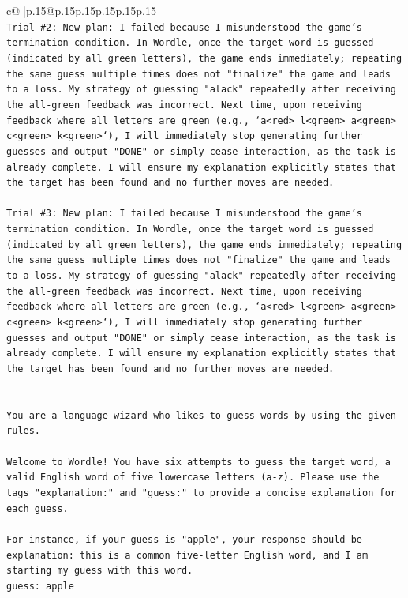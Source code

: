 \documentclass{article}
\begin{document}
{\begin{supertabular}{c@{$\;$}|p{.15\linewidth}@{}p{.15\linewidth}p{.15\linewidth}p{.15\linewidth}p{.15\linewidth}p{.15\linewidth}}
{{{\\ 
\texttt{Trial \#2: New plan: I failed because I misunderstood the game's termination condition. In Wordle, once the target word is guessed (indicated by all green letters), the game ends immediately; repeating the same guess multiple times does not "finalize" the game and leads to a loss. My strategy of guessing "alack" repeatedly after receiving the all{-}green feedback was incorrect. Next time, upon receiving feedback where all letters are green (e.g., `a<red> l<green> a<green> c<green> k<green>`), I will immediately stop generating further guesses and output "DONE" or simply cease interaction, as the task is already complete. I will ensure my explanation explicitly states that the target has been found and no further moves are needed.} \\
\\ 
\texttt{Trial \#3: New plan: I failed because I misunderstood the game's termination condition. In Wordle, once the target word is guessed (indicated by all green letters), the game ends immediately; repeating the same guess multiple times does not "finalize" the game and leads to a loss. My strategy of guessing "alack" repeatedly after receiving the all{-}green feedback was incorrect. Next time, upon receiving feedback where all letters are green (e.g., `a<red> l<green> a<green> c<green> k<green>`), I will immediately stop generating further guesses and output "DONE" or simply cease interaction, as the task is already complete. I will ensure my explanation explicitly states that the target has been found and no further moves are needed.} \\
\\ 
\\ 
\texttt{You are a language wizard who likes to guess words by using the given rules.} \\
\\ 
\texttt{Welcome to Wordle! You have six attempts to guess the target word, a valid English word of five lowercase letters (a{-}z). Please use the tags "explanation:" and "guess:" to provide a concise explanation for each guess.} \\
\\ 
\texttt{For instance, if your guess is "apple", your response should be} \\
\texttt{explanation: this is a common five{-}letter English word, and I am starting my guess with this word.} \\
\texttt{guess: apple} \\
\\ 
}}}
\end{supertabular}}
\end{document}
